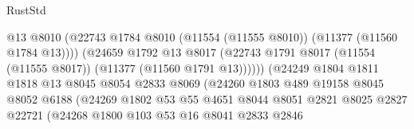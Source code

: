 \begin{lexlean}{RustStd}
\begin{coremodule}
                                            @13
                                            @8010
                                            (@22743
                                              @1784
                                              @8010
                                              (@11554 (@11555 @8010))
                                              (@11377 (@11560 @1784 @13))))
                                          (@24659
                                            @1792
                                            @13
                                            @8017
                                            (@22743
                                              @1791
                                              @8017
                                              (@11554 (@11555 @8017))
                                              (@11377 (@11560 @1791 @13))))))
                                      (@24249
                                        @1804
                                        @1811
                                        @1818
                                        @13
                                        @8045
                                        @8054
                                        @2833
                                        @8069
                                        (@24260
                                          @1803
                                          @489
                                          @19158
                                          @8045
                                          @8052
                                          @6188
                                          (@24269
                                            @1802
                                            @53
                                            @55
                                            @4651
                                            @8044
                                            @8051
                                            @2821
                                            @8025
                                            @2827
                                            @22721
                                            (@24268
                                              @1800
                                              @103
                                              @53
                                              @16
                                              @8041
                                              @2833
                                              @2846

\end{coremodule}
\end{lexlean}
